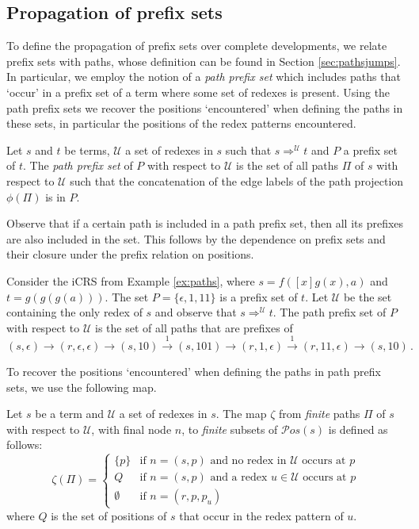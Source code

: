 \documentclass{LMCS}
\theoremstyle{definition}
\newcommand{\rew}{\rightarrow}
\newcommand{\pos}[1]{\mathcal{P}os(#1)}
\newcommand{\redpos}[1]{p_{#1}}
\newcommand{\apath}{\Pi}
\newcommand{\dev}{\Rightarrow}
\begin{document}
\subsection{Propagation of prefix sets}
\label{sec:prop_pre}

To define the propagation of prefix sets over complete developments, we relate prefix sets with paths, whose definition can be found in Section \ref{sec:pathsjumps}. In particular, we employ the notion of a \emph{path prefix set} which includes paths that `occur' in a prefix set of a term where some set of redexes is present. Using the path prefix sets we recover the positions `encountered' when defining the paths in these sets, in particular the positions of the redex patterns encountered.

\begin{defi}
Let $s$ and $t$ be terms, $\mathcal{U}$ a set of redexes in $s$ such that $s \dev^\mathcal{U} t$ and $P$ a prefix set of $t$. The \emph{path prefix set} of $P$ with respect to $\mathcal{U}$ is the set of all paths $\apath$ of $s$ with respect to $\mathcal{U}$ such that the concatenation of the edge labels of the path projection $\phi(\apath)$ is in $P$.
\end{defi}

Observe that if a certain path is included in a path prefix set, then all its prefixes are also included in the set. This follows by the dependence on prefix sets and their closure under the prefix relation on positions.

\begin{exa}
\label{ex:path_prefixes}
Consider the iCRS from Example \ref{ex:paths}, where
$s = f([x]g(x),a)$ and $t = g(g(g(a)))$.
The set $P = \{ \epsilon, 1, 11 \}$ is a prefix set of $t$.
Let $\mathcal{U}$ be the set containing the only redex of $s$ and
observe that $s \dev^\mathcal{U} t$.
The path prefix set of $P$ with respect to $\mathcal{U}$ is the set of all paths
that are prefixes of
\[
(s,\epsilon) \rew (r,\epsilon,\epsilon) \rew (s,10)
\overset{1}{\rew} (s,101) \rew (r,1,\epsilon) \overset{1}{\rew}
(r,11,\epsilon) \rew (s,10) \, .
\]
\end{exa}

To recover the positions `encountered' when defining the paths in path prefix sets, we use the following map.

\begin{defi}
Let $s$ be a term and $\mathcal{U}$ a set of redexes in $s$. The map $\zeta$ from \emph{finite} paths $\apath$ of $s$ with respect to $\mathcal{U}$, with final node $n$, to \emph{finite} subsets of $\pos{s}$ is defined as follows:
\[
\zeta(\apath) =
\begin{cases}
\{ p \}   & \text{if $n = (s, p)$ and no redex
                  in $\mathcal{U}$ occurs at $p$} \\
Q         & \text{if $n = (s, p)$ and a redex $u \in \mathcal{U}$ occurs
                  at $p$} \\
\emptyset & \text{if $n = (r, p, \redpos{u})$}
\end{cases}
\]
where $Q$ is the set of positions of $s$ that occur in the redex pattern of $u$.
\end{defi}
\end{document}
